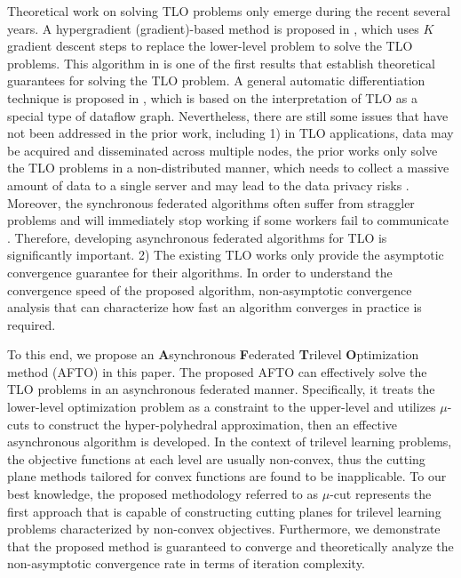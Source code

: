 \documentclass[letterpaper]{article} %
\begin{document}
Theoretical work on solving TLO problems only emerge during the recent several years. A hypergradient (gradient)-based method is proposed in \cite{sato2021gradient}, which uses $K$ gradient descent steps to replace the lower-level problem to solve the TLO problems. This algorithm in \cite{sato2021gradient} is one of the first results that establish theoretical guarantees for solving the TLO problem.  A general automatic differentiation technique is proposed in \cite{choe2022betty}, which is based on the interpretation of TLO as a special type of dataflow graph.
Nevertheless, there are still some issues that have not been addressed in the prior work, including 1) in TLO applications, data may be acquired and disseminated across multiple nodes, the prior works only solve the TLO problems in a non-distributed manner, which needs to collect a massive amount of data to a single server and may lead to the data privacy risks  \cite{subramanya2021centralized,jiao2022asynchronous,han2020adaptive}. Moreover, the synchronous federated algorithms often suffer from straggler
problems and will immediately stop working if some workers fail to communicate \cite{jiao2022asynchronous}. Therefore, developing asynchronous federated algorithms for TLO is significantly important. 2) The existing TLO works only provide the asymptotic convergence guarantee for their algorithms. In order to understand the convergence speed of the proposed algorithm, non-asymptotic convergence analysis that can characterize how fast an algorithm converges in practice is required.

To this end, we propose an \textbf{A}synchronous \textbf{F}ederated \textbf{T}rilevel \textbf{O}ptimization method (AFTO) in this paper. The proposed AFTO can effectively solve the TLO problems in an asynchronous federated manner. Specifically, it treats the lower-level optimization problem as a constraint to the upper-level and utilizes $\mu$-cuts to construct the hyper-polyhedral approximation, then an effective asynchronous algorithm is developed.  In the context of trilevel learning problems, the objective functions at each level are usually non-convex, thus the cutting plane methods tailored for convex functions \cite{jiao2022asynchronous,franc2011cutting} are found to be inapplicable. To our best knowledge, the proposed methodology referred to as  $\mu$-cut represents the first approach that is capable of constructing cutting planes for trilevel learning problems characterized by non-convex objectives. Furthermore, we demonstrate that the proposed method is guaranteed to converge and theoretically analyze the non-asymptotic convergence rate in terms of iteration complexity.
\end{document}
